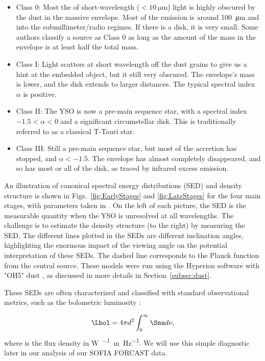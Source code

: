\begin{itemize}
\item Class 0: Most the of short-wavelength ($<\SI{10}{\micro\meter}$) light is highly obscured by the dust in the massive envelope. Most of the emission is around \SI{100}{\micro\meter} and into the submillimeter/radio regimes. If there is a disk, it is very small. Some authors \citep{Dunham:2010bx} classify a source as Class 0 as long as the amount of the mass in the envelope is at least half the total mass.
\item Class I: Light scatters at short wavelength off the dust grains to give us a hint at the embedded object, but it still very obscured. The envelope's mass is lower, and the disk extends to larger distances. The typical spectral index $\alpha$ is positive.
\item Class II: The YSO is now a pre-main sequence star, with a spectral index $-1.5 < \alpha < 0$ and a significant circumstellar disk. This is traditionally referred to as a classical T-Tauri star.
\item Class III: Still a pre-main sequence star, but most of the accretion has stopped, and $\alpha < -1.5$. The envelope has almost completely disappeared, and so has most or all of the disk, as traced by infrared excess emission.
\end{itemize}

An illustration of canonical spectral energy distributions (SED) and density structure is shown in Figs.~\ref{fig:EarlyStages} and \ref{fig:LateStages} for the four main stages, with parameters taken in \citet{Whitney:2003kc}. On the left of each picture, the SED is the measurable quantity when the YSO is unresolved at all wavelengths. The challenge is to estimate the density structure (to the right) by measuring the SED. The different lines plotted in the SEDs are different inclination angles, highlighting the enormous impact of the viewing angle on the potential interpretation of these SEDs. The dashed line corresponds to the Planck function from the central source. These models were run using the Hyperion software \citep{Robitaille:2011fc} with "OH5" dust \citep{Ossenkopf:1994tq}, as discussed in more details in Section~\ref{subsec:dust}.

These SEDs are often characterized and classified with standard observational metrics, such as the bolometric luminosity \citep{Myers:1993en,Dunham:2010bx}:

\begin{align}
\Lbol &= 4\pi d^2\int_0^\infty\Snu d\nu,\\
\end{align}
%
where \Snu is the flux density in \si{\watt\per{}\meter\per\hertz}. We will use this simple diagnostic later in our analysis of our SOFIA FORCAST data.

